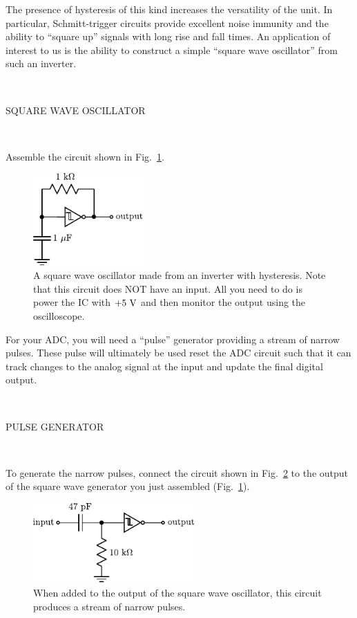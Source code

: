 \documentclass[12pt,oneside,openany,letterpaper]{article}
\begin{document}
\noindent The presence of hysteresis of this kind increases the versatility of the unit. In particular, Schmitt-trigger circuits provide excellent noise immunity and the ability to ``square up''
signals with long rise and fall times. An application of interest to us is the ability to construct a simple ``square wave oscillator'' from such an inverter.

~

\noindent SQUARE WAVE OSCILLATOR

~

\noindent Assemble the circuit shown in Fig.~\ref{fig:SqWave}.
\begin{figure}[h!]
\centering
    \includegraphics[width=0.375\textwidth]{figures/SqWave.pdf}
    \caption{A square wave oscillator made from an inverter with hysteresis.  Note that this circuit does NOT have an input.  All you need to do is power the IC with $+5\rm\ V$ and then monitor the output using the oscilloscope.}
    \label{fig:SqWave}
\end{figure}

\noindent For your ADC, you will need a ``pulse'' generator providing a stream of narrow pulses. These pulse will ultimately be used reset the ADC circuit such that it can track changes to the analog
signal at the input and update the final digital output.

~

\noindent PULSE GENERATOR

~

\noindent To generate the narrow pulses, connect the circuit shown in Fig.~\ref{fig:pulse} to the output of the square wave generator you just assembled (Fig.~\ref{fig:SqWave}).
\begin{figure}[h!]
\centering
    \includegraphics[width=0.55\textwidth]{figures/pulse.pdf}
    \caption{When added to the output of the square wave oscillator, this circuit produces a stream of narrow pulses.}
    \label{fig:pulse}
\end{figure}
\end{document}

